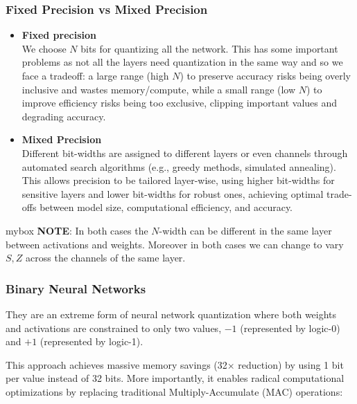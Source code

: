\subsubsection{Fixed Precision vs Mixed Precision}
\begin{itemize}
    \item \textbf{Fixed precision} \\
    We choose $N$ bits for quantizing all the network. This has some important problems as not all the layers need quantization in the same way and so we face a tradeoff: a large range (high $N$) to preserve accuracy risks being overly inclusive and wastes memory/compute, while a small range (low $N$) to improve efficiency risks being too exclusive, clipping important values and degrading accuracy. 

    \item \textbf{Mixed Precision} \\
    Different bit-widths are assigned to different layers or even channels through automated search algorithms (e.g., greedy methods, simulated annealing). This allows precision to be tailored layer-wise, using higher bit-widths for sensitive layers and lower bit-widths for robust ones, achieving optimal trade-offs between model size, computational efficiency, and accuracy.
\end{itemize}

mybox{
    \textbf{NOTE}: In both cases the $N$-width can be different in the same layer between activations and weights. Moreover in both cases we can change to vary $S,Z$ across the channels of the same layer.
}

\subsubsection{Binary Neural Networks}
They are an extreme form of neural network quantization where both weights and activations are constrained to only two values, $-1$ (represented by logic-0) and $+1$ (represented by logic-1).

This approach achieves massive memory savings (32× reduction) by using 1 bit per value instead of 32 bits. More importantly, it enables radical computational optimizations by replacing traditional Multiply-Accumulate (MAC) operations:

